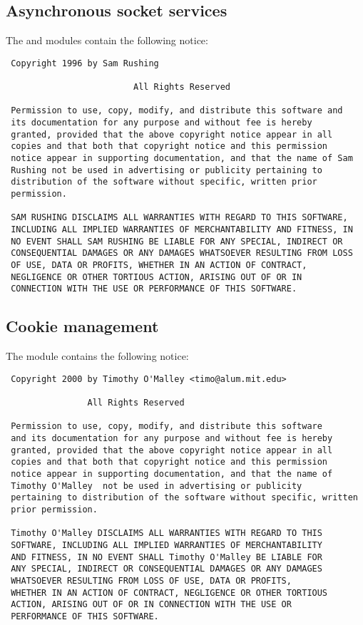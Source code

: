 \subsection{Asynchronous socket services}

The  and  modules contain the
following notice:

\begin{verbatim}      
 Copyright 1996 by Sam Rushing

                         All Rights Reserved

 Permission to use, copy, modify, and distribute this software and
 its documentation for any purpose and without fee is hereby
 granted, provided that the above copyright notice appear in all
 copies and that both that copyright notice and this permission
 notice appear in supporting documentation, and that the name of Sam
 Rushing not be used in advertising or publicity pertaining to
 distribution of the software without specific, written prior
 permission.

 SAM RUSHING DISCLAIMS ALL WARRANTIES WITH REGARD TO THIS SOFTWARE,
 INCLUDING ALL IMPLIED WARRANTIES OF MERCHANTABILITY AND FITNESS, IN
 NO EVENT SHALL SAM RUSHING BE LIABLE FOR ANY SPECIAL, INDIRECT OR
 CONSEQUENTIAL DAMAGES OR ANY DAMAGES WHATSOEVER RESULTING FROM LOSS
 OF USE, DATA OR PROFITS, WHETHER IN AN ACTION OF CONTRACT,
 NEGLIGENCE OR OTHER TORTIOUS ACTION, ARISING OUT OF OR IN
 CONNECTION WITH THE USE OR PERFORMANCE OF THIS SOFTWARE.
\end{verbatim}


\subsection{Cookie management}

The  module contains the following notice:

\begin{verbatim}
 Copyright 2000 by Timothy O'Malley <timo@alum.mit.edu>

                All Rights Reserved

 Permission to use, copy, modify, and distribute this software
 and its documentation for any purpose and without fee is hereby
 granted, provided that the above copyright notice appear in all
 copies and that both that copyright notice and this permission
 notice appear in supporting documentation, and that the name of
 Timothy O'Malley  not be used in advertising or publicity
 pertaining to distribution of the software without specific, written
 prior permission.

 Timothy O'Malley DISCLAIMS ALL WARRANTIES WITH REGARD TO THIS
 SOFTWARE, INCLUDING ALL IMPLIED WARRANTIES OF MERCHANTABILITY
 AND FITNESS, IN NO EVENT SHALL Timothy O'Malley BE LIABLE FOR
 ANY SPECIAL, INDIRECT OR CONSEQUENTIAL DAMAGES OR ANY DAMAGES
 WHATSOEVER RESULTING FROM LOSS OF USE, DATA OR PROFITS,
 WHETHER IN AN ACTION OF CONTRACT, NEGLIGENCE OR OTHER TORTIOUS
 ACTION, ARISING OUT OF OR IN CONNECTION WITH THE USE OR
 PERFORMANCE OF THIS SOFTWARE.
\end{verbatim}      



